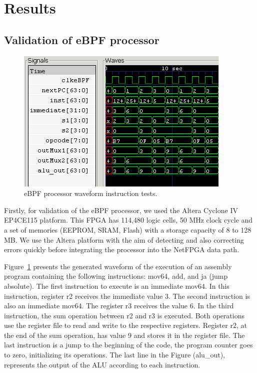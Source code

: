 \section{Results}
\label{sec:results}

\subsection{Validation of eBPF processor}

\begin{figure}[bth]
\centering
\includegraphics[width=1.\linewidth]{figures/07_fig02half.png}
\caption{eBPF processor waveform instruction tests.}
\label{fig:07_fig02}
\end{figure}


Firstly, for validation of the eBPF processor, we used the Altera Cyclone IV EP4CE115 platform. This FPGA has 114,480 logic cells, 50 MHz clock cycle and a set of memories (EEPROM, SRAM, Flash) with a storage capacity of 8 to 128 MB. We use the Altera platform with the aim of detecting and also correcting errors quickly before integrating the processor into the NetFPGA data path.






Figure~\ref{fig:07_fig02} presents the generated waveform of the execution of an assembly program containing the following instructions: mov64, add, and ja (jump absolute). The first instruction to execute is an immediate mov64. In this instruction, register r2 receives the immediate value 3. The second instruction is also an immediate mov64. The register r3 receives the value 6. In the third instruction, the sum operation between r2 and r3 is executed. Both operations use the register file to read and write to the respective registers. Register r2, at the end of the sum operation, has value 9 and stores it in the register file. The last instruction is a jump to the beginning of the code, the program counter goes to zero, initializing its operations. The last line in the Figure (alu\_out), represents the output of the ALU according to each instruction.



